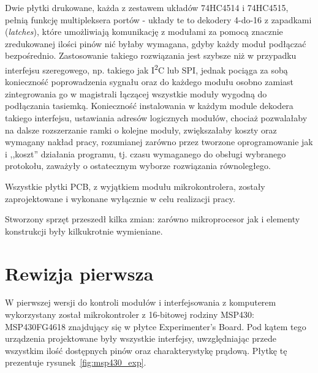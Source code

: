 Dwie płytki drukowane, każda z zestawem układów 74HC4514 i 74HC4515, pełnią funkcję multipleksera portów - układy te to dekodery 4-do-16 z zapadkami (\textsl{latches}), które umożliwiają komunikację z modułami za pomocą znacznie zredukowanej ilości pinów nić byłaby wymagana, gdyby każdy moduł podłączać bezpośrednio. Zastosowanie takiego rozwiązania jest szybsze niż w przypadku interfejsu szeregowego, np. takiego jak I\textsuperscript{2}C lub SPI, jednak pociąga za sobą konieczność poprowadzenia sygnału  oraz  do każdego modułu osobno zamiast zintegrowania go w magistrali łączącej wszystkie moduły wygodną do podłączania tasiemką. Konieczność instalowania w każdym module dekodera takiego interfejsu, ustawiania adresów logicznych modułów, chociaż pozwalałaby na dalsze rozszerzanie ramki o kolejne moduły, zwiększałaby koszty oraz wymagany nakład pracy, rozumianej zarówno przez tworzone oprogramowanie jak i ,,koszt'' działania programu, tj. czasu wymaganego do
obsługi wybranego protokołu, zaważyły o ostatecznym wyborze rozwiązania równoległego.

Wszystkie płytki PCB, z wyjątkiem modułu mikrokontrolera, zostały zaprojektowane i wykonane wyłącznie w celu realizacji pracy.

Stworzony sprzęt przeszedł kilka zmian: zarówno mikroprocesor jak i elementy konstrukcji były kilkukrotnie wymieniane.\\

\section{Rewizja pierwsza}

W pierwszej wersji do kontroli modułów i interfejsowania z komputerem wykorzystany został mikrokontroler z 16-bitowej rodziny MSP430: MSP430FG4618 znajdujący się w płytce Experimenter's Board.
Pod kątem tego urządzenia projektowane były wszystkie interfejsy, uwzględniając przede wszystkim ilość dostępnych pinów oraz charakterystykę prądową.
Płytkę tę prezentuje rysunek~\ref{fig:msp430_exp}.

